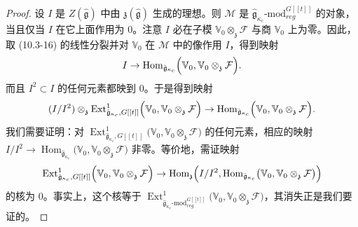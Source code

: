 \begin{proof}
    设 $I$ 是 $Z(\hat{\mathfrak{g}})$ 中由 $\mathfrak{z}(\hat{\mathfrak{g}})$ 生成的理想。则 $\mathcal{M}$ 是 $\hat{\mathfrak{g}}_{\kappa_c}\text{-mod}^{G[[t]]}_{reg}$ 的对象，当且仅当 $I$ 在它上面作用为 $0$。注意 $I$ 必在子模 $\mathbb{V}_0\otimes_{\mathfrak{z}}\mathcal{F}$ 与商 $\mathbb{V}_0$ 上为零。因此，取 (10.3-16) 的线性分裂并对 $\mathbb{V}_0$ 在 $\mathcal{M}$ 中的像作用 $I$，得到映射
    \[
        I\to\operatorname{Hom}_{\hat{\mathfrak{g}}_{\kappa_c}}
        \Bigl(\mathbb{V}_0,\mathbb{V}_0\otimes_{\mathfrak{z}}\mathcal{F}\Bigr).
    \]
    而且 $I^2\subset I$ 的任何元素都映到 $0$。于是得到映射
    \[
        (I/I^2)\otimes_{\mathfrak{z}}\operatorname{Ext}^1_{\hat{\mathfrak{g}}_{\kappa_c},G[[t]]}
        \Bigl(\mathbb{V}_0,\mathbb{V}_0\otimes_{\mathfrak{z}}\mathcal{F}\Bigr)
        \to\operatorname{Hom}_{\hat{\mathfrak{g}}_{\kappa_c}}
        \Bigl(\mathbb{V}_0,\mathbb{V}_0\otimes_{\mathfrak{z}}\mathcal{F}\Bigr).
    \]
    我们需要证明：对 $\operatorname{Ext}^1_{\hat{\mathfrak{g}}_{\kappa_c},G[[t]]}\bigl(\mathbb{V}_0,\mathbb{V}_0\otimes_{\mathfrak{z}}\mathcal{F}\bigr)$ 的任何元素，相应的映射 $I/I^2\to\operatorname{Hom}_{\hat{\mathfrak{g}}_{\kappa_c}}\bigl(\mathbb{V}_0,\mathbb{V}_0\otimes_{\mathfrak{z}}\mathcal{F}\bigr)$ 非零。等价地，需证映射
    \[
        \operatorname{Ext}^1_{\hat{\mathfrak{g}}_{\kappa_c},G[[t]]}
        \Bigl(\mathbb{V}_0,\mathbb{V}_0\otimes_{\mathfrak{z}}\mathcal{F}\Bigr)
        \to\operatorname{Hom}_{\mathfrak{z}}\Bigl(I/I^2,
        \operatorname{Hom}_{\hat{\mathfrak{g}}_{\kappa_c}}
        \bigl(\mathbb{V}_0,\mathbb{V}_0\otimes_{\mathfrak{z}}\mathcal{F}\bigr)\Bigr)
    \]
    的核为 $0$。事实上，这个核等于 $\operatorname{Ext}^1_{\hat{\mathfrak{g}}_{\kappa_c}\text{-mod}^{G[[t]]}_{reg}}\bigl(\mathbb{V}_0,\mathbb{V}_0\otimes_{\mathfrak{z}}\mathcal{F}\bigr)$，其消失正是我们要证的。


\end{proof}
